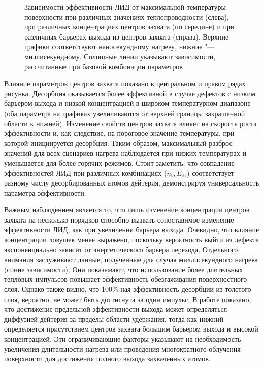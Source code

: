 \begin{figure}[ht]
    \caption{Зависимости эффективности ЛИД от максимальной температуры поверхности при различных значениях теплопроводности (слева), при различных концентрациях центров захвата (по середине) и при различных барьерах выхода из центров захвата (справа). Верхние графики соответствуют наносекундному нагреву, нижние "--- миллисекундному. Сплошные линии указывают зависимости, рассчитанные при базовой комбинации параметров}\label{fig:LID_kappa_n_Edt_var}
\end{figure}

Влияние параметров центров захвата показано в центральном и правом рядах рисунка. Десорбция оказывается более эффективной в случае дефектов с низким барьером выхода и низкой концентрацией в широком температурном диапазоне (оба параметра на графиках увеличиваются от верхней границы закрашенной области к нижней). Изменение свойств центров захвата влияет на скорость роста эффективности и, как следствие, на пороговое значение температуры, при которой инициируется десорбция. Таким образом, максимальный разброс значений для всех сценариев нагрева наблюдается при низких температурах и уменьшается для более горячих режимов. Стоит заметить, что совпадение эффективностей ЛИД при различных комбинациях (\(n_\mathrm{t}, E_\mathrm{dt}\)) соответствует разному числу десорбированных атомов дейтерия, демонстрируя универсальность параметра эффективности. 

Важным наблюдением является то, что лишь изменение концентрации центров захвата на несколько порядков способно вызвать сопоставимое изменение эффективности ЛИД, как при увеличении барьера выхода. Очевидно, что влияние концентрации ловушек менее выражено, поскольку вероятность выйти из дефекта экспоненциально зависит от энергетического барьера перехода. Отдельного внимания заслуживают данные, полученные для случая миллисекундного нагрева (синие зависимости). Они показывают, что использование более длительных тепловых импульсов повышает эффективность обезгаживания поверхностного слоя. Однако также видно, что 100\%-ная эффективность десорбции из толстого слоя, вероятно, не может быть достигнута за один импульс. В работе показано, что достижение предельной эффективности выхода может определяться диффузией дейтерия за пределы области удержания, тогда как нижний определяется присутствием центров захвата большим барьером выхода и высокой концентрацией. Эти ограничивающие факторы указывают на необходимость увеличения длительности нагрева или проведения многократного облучения поверхности для достижения полного выхода захваченных атомов.

